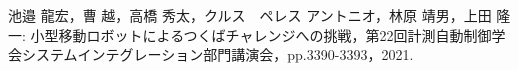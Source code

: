 \documentclass[twocolumn,9pt]{jsproceedings}
\begin{document}
\begin{thebibliography}{99}
 池邉 龍宏，曹 越，高橋 秀太，クルス　ペレス アントニオ，林原 靖男，上田 隆一: 小型移動ロボットによるつくばチャレンジへの挑戦，第22回計測自動制御学会システムインテグレーション部門講演会，pp.3390-3393，2021.






  
  
  
  

\end{thebibliography}
\normalsize
\end{document}
